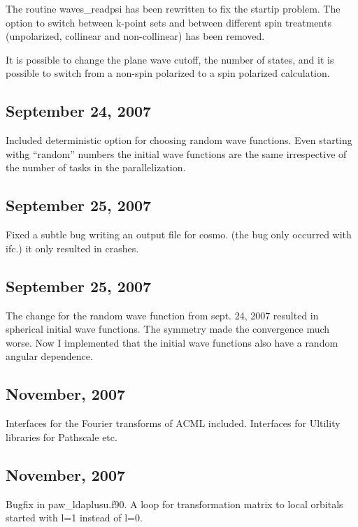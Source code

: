 \documentclass[final,12pt]{article}
\begin{document}
The routine waves\_readpsi has been rewritten to fix the startip
problem.  The option to switch between k-point sets and between
different spin treatments (unpolarized, collinear and non-collinear)
has been removed.

It is possible to change the plane wave cutoff, the number of states,
and it is possible to switch from a non-spin polarized to a spin
polarized calculation.

\subsection{September 24,  2007}

Included deterministic option for choosing random wave functions.
Even starting withg ``random'' numbers the initial wave functions are
the same irrespective of the number of tasks in the parallelization.

\subsection{September 25,  2007}

Fixed a subtle bug writing an output file for cosmo. (the bug only occurred with ifc.)
it only resulted in crashes.

\subsection{September 25,  2007}

The change for the random wave function from sept. 24, 2007 resulted
in spherical initial wave functions. The symmetry made the convergence
much worse. Now I implemented that the initial wave functions also have a
random angular dependence.

\subsection{November,  2007}

Interfaces for the Fourier transforms of ACML included. Interfaces for
Ultility libraries for Pathscale etc.

\subsection{November,  2007}

Bugfix in paw\_ldaplusu.f90. A loop for transformation matrix to local
orbitals started with l=1 instead of l=0.
\end{document}
